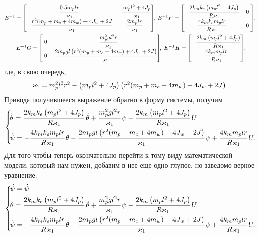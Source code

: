 \documentclass[12pt,a4paper,openany]{extarticle}
\begin{document}
\begin{gather}
	E^{-1} = 
	\begin{bmatrix}
		\cfrac{0.5m_plr}{\varkappa_1} & -\cfrac{m_pl^2 + 4J_p}{\varkappa_1}\\
		-\cfrac{r^2(m_p + m_c + 4m_w) + 4J_w + 2J}{\varkappa_1} & \cfrac{2m_plr}{\varkappa_1}
	\end{bmatrix}\!\!,\;
	E^{-1}F = 
	\begin{bmatrix}
		-\cfrac{2k_mk_e\left(m_pl^2 + 4J_p\right)}{R\varkappa_1} & \phantom{!}0\phantom{!}\\
		\cfrac{4k_mk_em_plr}{R\varkappa_1} & 0
	\end{bmatrix}\!\!,\;\notag\\
	E^{-1}G = 
	\begin{bmatrix}
		\phantom{!}0\phantom{!} & -\cfrac{m_p^2gl^2r}{\varkappa_1}\\
		0 & \cfrac{2m_pgl\left(r^2(m_p + m_c + 4m_w) + 4J_w + 2J\right)}{\varkappa_1}
	\end{bmatrix}\!\!,\;
	E^{-1}H = 
	\begin{bmatrix}
		-\cfrac{2k_m\left(m_pl^2 + 4J_p\right)}{R\varkappa_1} \\
		\cfrac{4k_mm_plr}{R\varkappa_1} 
	\end{bmatrix}\!\!,
\end{gather} 
где, в свою очередь,
\begin{equation}
	\varkappa_1 = m_p^2l^2r^2 - \left(m_pl^2 + 4J_p\right)\left(r^2(m_p + m_c +
	 4m_w)+4J_w + 2J\right)\ldotp
\end{equation}
Приводя получившееся выражение обратно в форму системы, получим
\begin{equation}
	\left\{  
	\begin{aligned}
		\!&\ddot\theta = \cfrac{2k_mk_e\left(m_pl^2 + 4J_p\right)}{R\varkappa_1}\,\dot\theta +
		\cfrac{m_p^2gl^2r}{\varkappa_1}\,\psi 
		-\cfrac{2k_m\left(m_pl^2 + 4J_p\right)}{R\varkappa_1}\,U\\
		\!&\ddot\psi = -\cfrac{4k_mk_em_plr}{R\varkappa_1}\,\dot\theta -
		\cfrac{2m_pgl\left(r^2(m_p + m_c + 4m_w) + 4J_w + 2J\right)}{\varkappa_1}\,\psi +
		\cfrac{4k_mm_plr}{R\varkappa_1}\,U.
	\end{aligned}   
	\right.
\end{equation}
Для того чтобы теперь окончательно перейти к тому виду математической модели, который нам нужен, добавим в нее еще одно глупое, но заведомо верное уравнение:
\begin{equation}\label{math_model}
	\left\{  
	\begin{aligned}
		\!& \dot{\psi} = \dot{\psi} \\
		\!&\ddot\theta = \cfrac{2k_mk_e\left(m_pl^2 + 4J_p\right)}{R\varkappa_1}\,\dot\theta +
		\cfrac{m_p^2gl^2r}{\varkappa_1}\,\psi 
		-\cfrac{2k_m\left(m_pl^2 + 4J_p\right)}{R\varkappa_1}\,U\\
		\!&\ddot\psi = -\cfrac{4k_mk_em_plr}{R\varkappa_1}\,\dot\theta -
		\cfrac{2m_pgl\left(r^2(m_p + m_c + 4m_w) + 4J_w + 2J\right)}{\varkappa_1}\,\psi +
		\cfrac{4k_mm_plr}{R\varkappa_1}\,U.
	\end{aligned}   
	\right.
\end{equation}
\end{document}
